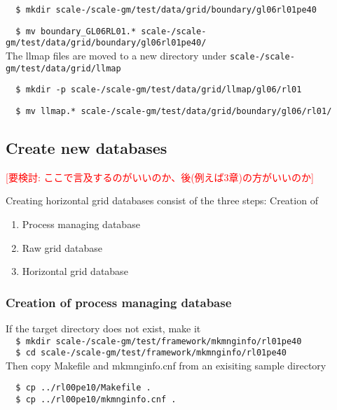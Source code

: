 \verb|  $ mkdir scale-|{\version}\verb|/scale-gm/test/data/grid/boundary/gl06rl01pe40|

\verb|  $ mv boundary_GL06RL01.* scale-|{\version}\verb|/scale-gm/test/data/grid/boundary/gl06rl01pe40/|
\\

\noindent The llmap files are moved to a new directory under 
\texttt{scale-{\version}/scale-gm/test/data/grid/llmap}

\verb|  $ mkdir -p scale-|{\version}\verb|/scale-gm/test/data/grid/llmap/gl06/rl01|

\verb|  $ mv llmap.* scale-|{\version}\verb|/scale-gm/test/data/grid/boundary/gl06/rl01/| \\


\subsection{Create new databases}
\textcolor{red}{[要検討: ここで言及するのがいいのか、後(例えば3章)の方がいいのか]}

Creating horizontal grid databases consist of the three steps: Creation of 
\begin{enumerate}
  \item Process managing database
  \item Raw grid database
  \item Horizontal grid database
\end{enumerate}

\subsubsection{Creation of process managing database} 

If the target directory does not exist, make it \\

\verb|  $ mkdir scale-|{\version}\verb|/scale-gm/test/framework/mkmnginfo/rl01pe40| \\

\verb|  $ cd scale-|{\version}\verb|/scale-gm/test/framework/mkmnginfo/rl01pe40| \\

Then copy Makefile and mkmnginfo.cnf from an exisiting sample directory
\begin{verbatim}
  $ cp ../rl00pe10/Makefile .
  $ cp ../rl00pe10/mkmnginfo.cnf .
\end{verbatim}

